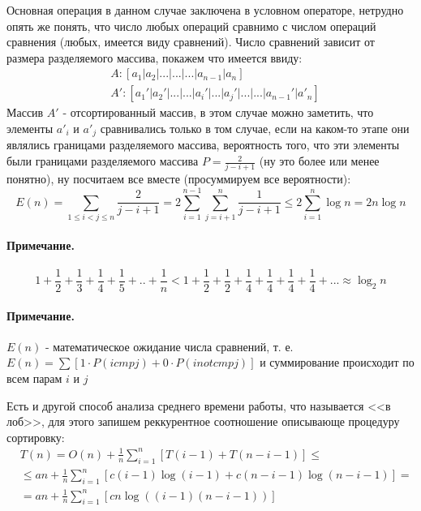 Основная операция в данном случае заключена в условном операторе, нетрудно опять же понять, что число любых операций сравнимо с числом операций сравнения (любых, имеется виду сравнений). Число сравнений зависит от размера разделяемого массива, покажем что имеется ввиду:
\[
	\begin{split}
		& A : [ a_1 | a_2 | ...  | ...  |  ...  | a_{n-1} | a_n ] \\
		& A': [ a_1' | a_2' | ... | ... | a_i' | ... | a_j' | ... | ... | a_{n-1}' | a'_n ]
	\end{split}
\]
Массив $A'$ - отсортированный массив, в этом случае можно заметить, что элементы $a'_i$ и $a'_j$ сравнивались только в том случае, если на каком-то этапе они являлись границами разделяемого массива, вероятность того, что эти элементы были границами разделяемого массива $P = \frac{2}{j-i+1}$ (ну это более или менее понятно), ну посчитаем все вместе (просуммируем все вероятности):
\[
	E\left(n\right) = \sum_{1 \le i < j \le n} \frac{2}{j-i+1} = 2 \sum_{i=1}^{n-1} \sum_{j=i+1}^{n} \frac{1}{j-i+1} \le 2 \sum_{i=1}^n \log n = 2n\log n
\]

\paragraph{Примечание.} 
\[
	1 + \frac{1}{2} + \frac{1}{3} + \frac{1}{4} + \frac{1}{5} + .. + \frac{1}{n} < 1 + \frac{1}{2} + \frac{1}{2} + \frac{1}{4} + \frac{1}{4} + \frac{1}{4} + \frac{1}{4} + ... \approx \log_2 n
\]

\paragraph{Примечание.}
$E\left(n\right)$ - математическое ожидание числа сравнений, т. е. $E\left(n\right) = \sum \left[1 \cdot P\left(i cmp j\right) + 0 \cdot P\left(i not cmp j \right)\right]$ и суммирование происходит по всем парам $i$ и $j$

Есть и другой способ анализа среднего времени работы, что называется <<в лоб>>, для этого запишем реккурентное соотношение описывающе процедуру сортировку:
\[
	\begin{split}
		& T\left(n\right) = O \left(n\right) + \frac{1}{n} \sum_{i=1}^n \left[T\left(i-1\right) + T\left(n-i-1\right) \right] \le \\
		& \le an + \frac{1}{n} \sum_{i=1}^{n} \left[c\left(i-1\right)\log \left(i-1\right) + c\left(n-i-1\right)\log \left(n-i-1\right)\right]  = \\
		& = an + \frac{1}{n} \sum_{i=1}^n \left[cn \log \left(\left(i-1\right)\left(n-i-1\right)\right)\right]
	\end{split}
\]
